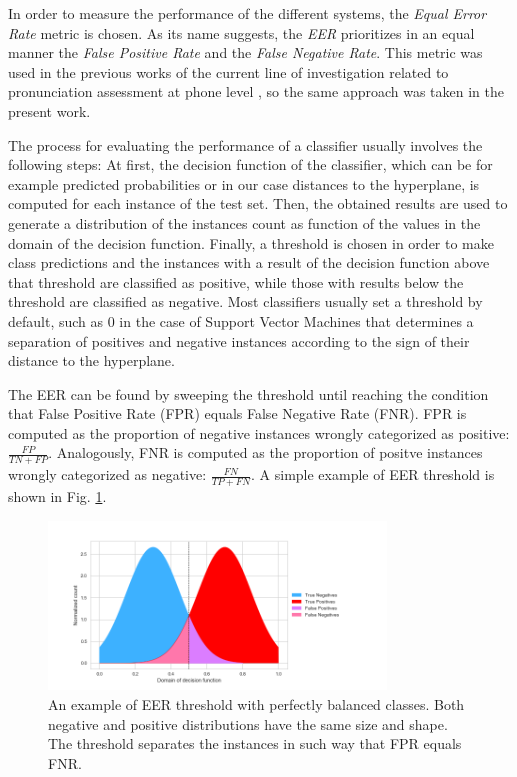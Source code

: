 In order to measure the performance of the different systems, the \textit{Equal Error Rate} metric
is chosen. As its name suggests, the \textit{EER} prioritizes in an equal manner the
\textit{False Positive Rate} and the \textit{False Negative Rate}.
This metric was used
in the previous works of the current line of investigation related to pronunciation assessment
at phone level \cite{detection_phone_level_mispronunciation_learning, main}, so the same approach
was taken in the present work.

The process for evaluating the performance of a classifier usually involves the following steps:
At first, the decision function of the classifier, which can be for example predicted probabilities
or in our case distances to the hyperplane, is computed for each instance of the test set.
Then, the obtained results are used to generate
a distribution of the instances count as function of the values
in the domain of the decision function. Finally,
a threshold is chosen in order to make class predictions
and the instances with a result of the
decision function above that threshold are classified as positive, while
those with results below the threshold are classified as negative. Most classifiers
usually set a threshold by default, such as 0 in the case of Support Vector Machines that
determines a separation of
positives and negative instances according to the sign of their distance to the hyperplane.

The EER can be found by sweeping the threshold until reaching the condition that
False Positive Rate (FPR) equals False Negative Rate (FNR). FPR is computed as
the proportion of negative instances wrongly
categorized as positive: $\frac{FP}{TN+FP}$.
Analogously, FNR is computed as the proportion of positve
instances wrongly categorized as negative:
$\frac{FN}{TP+FN}$. A simple example of EER threshold is
shown in Fig. \ref{fig:eer}.

\begin{figure}[H]
  \centering
  \includegraphics[width=0.8\textwidth]{files/figures/method/eer}
  \caption{An example of EER threshold with perfectly balanced classes. Both negative and positive distributions have the same size and shape.
  The threshold separates the instances in such way that FPR equals FNR.}
  \label{fig:eer}
\end{figure}
